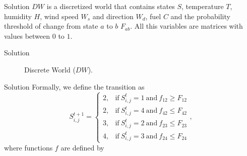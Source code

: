 \documentclass{beamer}
\begin{document}
      \begin{frame}{Solution}
        $DW$ is a discretized world that contains states $S$, temperature $T$, humidity $H$, wind speed $W_s$ 
        and direction $W_d$, fuel $C$ and the probability threshold of change from state $a$ to $b$ $F_{ab}$. 
        All this variables are matrices with values between $0$ to $1$. 
      \end{frame}

      \begin{frame}{Solution}
        \begin{figure}
          \centering
          \resizebox{0.5\textwidth}{!}{
            
          }    
          \caption{Discrete World ($DW$).}
          \label{fig:discrete_world}
        \end{figure}
      \end{frame}

      \begin{frame}{Solution}
        Formally, we define the transition as
        \begin{equation}
          S_{i,j}^{t+1} =
          \begin{cases}
            2, & \text{if} ~ S_{i,j}^{t} = 1 ~ \text{and} ~ f_{12} \geq F_{12} \\
            2, & \text{if} ~ S_{i,j}^{t} = 4 ~ \text{and} ~ f_{42} \leq F_{42} \\
            3, & \text{if} ~ S_{i,j}^{t} = 2 ~ \text{and} ~ f_{23} \leq F_{23} \\
            4, & \text{if} ~ S_{i,j}^{t} = 3 ~ \text{and} ~ f_{24} \leq F_{24}
          \end{cases},
          \label{eq:transition_rule}
        \end{equation}
        where functions $f$ are defined by
      \end{frame}
      
\end{document}
